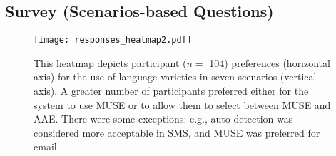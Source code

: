 \subsection{Survey (Scenarios-based Questions)}

\begin{figure}[t]
\centering
\texttt{[image: responses\_heatmap2.pdf]}
\caption{\footnotesize{This heatmap depicts participant ($n=$ 104) preferences (horizontal axis) for the use of language varieties in seven scenarios (vertical axis). A greater number of participants preferred either for the system to use MUSE or to allow them to select between MUSE and AAE. There were some exceptions: e.g., auto-detection was considered more acceptable in SMS, and MUSE was preferred for email.}}%
\label{fig:heatmap}
\end{figure}




